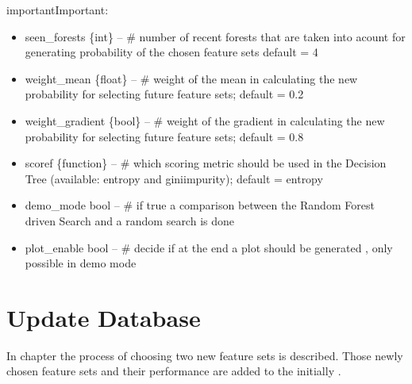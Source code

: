 \documentclass[letterpaper,10pt,english]{sphinxmanual}
\begin{document}
\begin{sphinxadmonition}{important}{Important:}
\begin{fulllineitems}
\begin{itemize}
\item {} 
seen\_forests \{int\} -- \# number of recent forests that are taken into acount for generating probability of the chosen feature sets default = 4

\item {} 
weight\_mean \{float\} -- \# weight of the mean in calculating the new probability for selecting future feature sets; default = 0.2

\item {} 
weight\_gradient \{bool\} -- \# weight of the gradient in calculating the new probability for selecting future feature sets; default = 0.8

\item {} 
scoref \{function\} -- \# which scoring metric should be used in the Decision Tree (available: entropy and giniimpurity); default = entropy

\item {} 
demo\_mode bool -- \# if true a comparison between the Random Forest driven Search and a random search is done

\item {} 
plot\_enable bool -- \# decide if at the end a plot should be generated , only possible in demo mode

\end{itemize}

\end{fulllineitems}

\end{sphinxadmonition}
\label{\detokenize{RF:blank}}\begin{figure}[htbp]
\centering

\noindent{}
\label{\detokenize{RF:blank}}\end{figure}


\section{Update Database}
\label{\detokenize{Update_Database:update-database}}\label{\detokenize{Update_Database::doc}}\label{\detokenize{Update_Database:id1}}
In chapter {\hyperref[\detokenize{RF:random-forest}]{}} the process of choosing two new feature sets is described.
Those newly chosen feature sets and their performance are added to the initially {\hyperref[\detokenize{Generate_Database:compute}]{}}.
\end{document}
